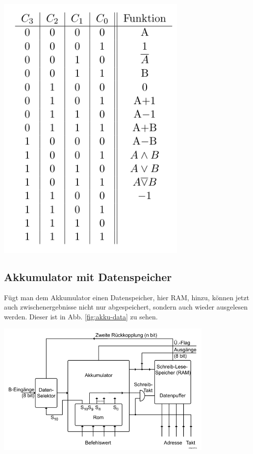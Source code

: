 \documentclass[10pt]{article}
\newenvironment{Figure}
  {\par\medskip\noindent\minipage{\linewidth}}
  {\endminipage\par\medskip}
\begin{document}
\begin{multicols}{2}
\begin{Figure}
		\centering\includegraphics[width=0.7\textwidth]{sinvolle-alu-funktionen.png}
		\label{fig:alu-befehle}
	\end{Figure}
	\subsection{Akkumulator mit Datenspeicher}
	Fügt man dem Akkumulator einen Datenspeicher, hier RAM, hinzu, können jetzt auch zwischenergebnisse nicht nur abgespeichert, sondern auch wieder ausgelesen werden. Dieser ist in Abb. \ref{fig:akku-data} zu sehen.
	\begin{Figure}
		\centering\includegraphics[width=0.8\textwidth]{akku-und-datenspeicher.png}
		\label{fig:akku-data}
	\end{Figure}

\end{multicols}
\end{document}
